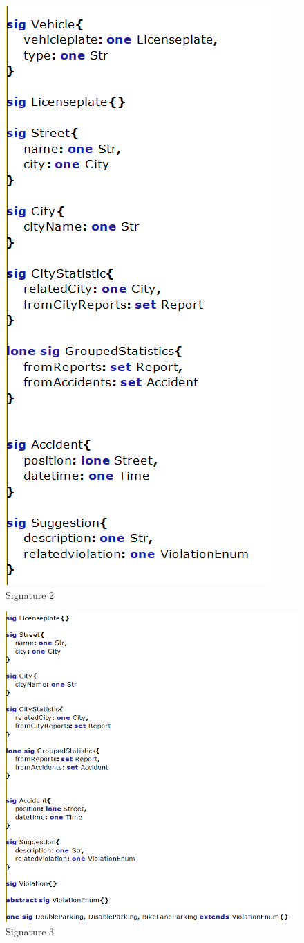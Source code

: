 \begin{figure}[h]
	\centering
	\includegraphics[width=0.5\linewidth, height=0.65\textheight]{Images/Alloy/codealloy2}
	\caption{Signature 2}
	\label{Signature 2}
\end{figure}

\begin{figure}[h]
	\centering
	\includegraphics[width=0.9\linewidth, height=0.7\textheight]{Images/Alloy/codealloy3}
	\caption{Signature 3}
	\label{Signature 3}
\end{figure}

